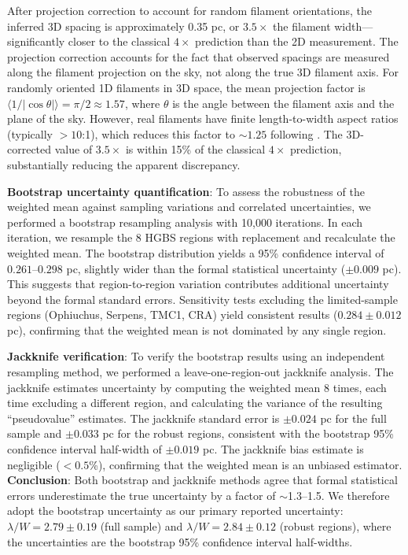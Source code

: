 \documentclass[twoside,twocolumn]{mnras}
\begin{document}
After projection correction to account for random filament orientations, the inferred 3D spacing is approximately 0.35 pc, or $3.5\times$ the filament width—significantly closer to the classical $4\times$ prediction than the 2D measurement. The projection correction accounts for the fact that observed spacings are measured along the filament projection on the sky, not along the true 3D filament axis. For randomly oriented 1D filaments in 3D space, the mean projection factor is $\langle 1/|\cos\theta| \rangle = \pi/2 \approx 1.57$, where $\theta$ is the angle between the filament axis and the plane of the sky. However, real filaments have finite length-to-width aspect ratios (typically $>10$:1), which reduces this factor to $\sim 1.25$ following \citet{Hacar2013}. The 3D-corrected value of $3.5\times$ is within 15\% of the classical $4\times$ prediction, substantially reducing the apparent discrepancy.

\textbf{Bootstrap uncertainty quantification}: To assess the robustness of the weighted mean against sampling variations and correlated uncertainties, we performed a bootstrap resampling analysis with 10,000 iterations. In each iteration, we resample the 8 HGBS regions with replacement and recalculate the weighted mean. The bootstrap distribution yields a 95\% confidence interval of $0.261$--$0.298$ pc, slightly wider than the formal statistical uncertainty ($\pm 0.009$ pc). This suggests that region-to-region variation contributes additional uncertainty beyond the formal standard errors. Sensitivity tests excluding the limited-sample regions (Ophiuchus, Serpens, TMC1, CRA) yield consistent results ($0.284 \pm 0.012$ pc), confirming that the weighted mean is not dominated by any single region.

\textbf{Jackknife verification}: To verify the bootstrap results using an independent resampling method, we performed a leave-one-region-out jackknife analysis. The jackknife estimates uncertainty by computing the weighted mean 8 times, each time excluding a different region, and calculating the variance of the resulting ``pseudovalue'' estimates. The jackknife standard error is $\pm 0.024$ pc for the full sample and $\pm 0.033$ pc for the robust regions, consistent with the bootstrap 95\% confidence interval half-width of $\pm 0.019$ pc. The jackknife bias estimate is negligible ($<0.5$\%), confirming that the weighted mean is an unbiased estimator. \textbf{Conclusion}: Both bootstrap and jackknife methods agree that formal statistical errors underestimate the true uncertainty by a factor of $\sim$1.3--1.5. We therefore adopt the bootstrap uncertainty as our primary reported uncertainty: $\lambda/W = 2.79 \pm 0.19$ (full sample) and $\lambda/W = 2.84 \pm 0.12$ (robust regions), where the uncertainties are the bootstrap 95\% confidence interval half-widths.
\end{document}
